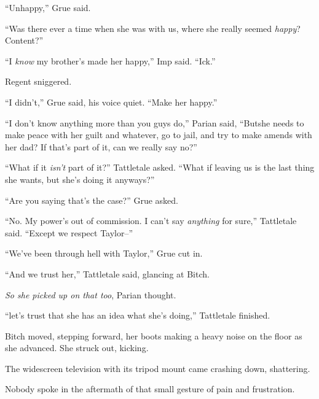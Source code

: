 ``Unhappy,'' Grue said.



``Was there ever a time when she was with us, where she really seemed \emph{happy}?  Content?''



``I \emph{know }my brother's made her happy,'' Imp said.  ``Ick.''



Regent sniggered.



``I didn't,'' Grue said, his voice quiet.  ``Make her happy.''



``I don't know anything more than you guys do,'' Parian said, ``But\ldotsMaybe she needs to make peace with her guilt and whatever, go to jail, and try to make amends with her dad?  If that's part of it, can we really say no?''



``What if it \emph{isn't }part of it?'' Tattletale asked.  ``What if leaving us is the last thing she wants, but she's doing it anyways?''



``Are you saying that's the case?'' Grue asked.



``No.  My power's out of commission.  I can't say \emph{anything} for sure,'' Tattletale said.  ``Except we respect Taylor--''



``We've been through hell with Taylor,'' Grue cut in.



``And we trust her,'' Tattletale said, glancing at Bitch.



\emph{So she picked up on that too}, Parian thought.



``\ldotsSo let's trust that she has an idea what she's doing,'' Tattletale finished.



Bitch moved, stepping forward, her boots making a heavy noise on the floor as she advanced.  She struck out, kicking.



The widescreen television with its tripod mount came crashing down, shattering.



Nobody spoke in the aftermath of that small gesture of pain and frustration.



